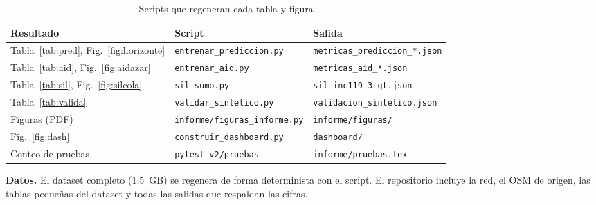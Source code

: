\begin{table}[h]
\centering
\caption{Scripts que regeneran cada tabla y figura}
\label{tab:scripts}
\scriptsize
\setlength{\tabcolsep}{2.5pt}
\begin{tabular}{@{}L{2.35cm}L{2.9cm}L{3.1cm}@{}}
\toprule
Resultado & Script & Salida \\
\midrule
Tabla~\ref{tab:pred}, Fig.~\ref{fig:horizonte} & \texttt{entrenar\_prediccion.py} & \texttt{metricas\_prediccion\_*.json} \\
Tabla~\ref{tab:aid}, Fig.~\ref{fig:aidazar} & \texttt{entrenar\_aid.py} & \texttt{metricas\_aid\_*.json} \\
Tabla~\ref{tab:sil}, Fig.~\ref{fig:silcola} & \texttt{sil\_sumo.py} & \texttt{sil\_inc119\_3\_gt.json} \\
Tabla~\ref{tab:valida} & \texttt{validar\_sintetico.py} & \texttt{validacion\_sintetico.json} \\
Figuras (PDF) & \texttt{informe/figuras\_informe.py} & \texttt{informe/figuras/} \\
Fig.~\ref{fig:dash} & \texttt{construir\_dashboard.py} & \texttt{dashboard/} \\
Conteo de pruebas & \texttt{pytest v2/pruebas} & \texttt{informe/pruebas.tex} \\
\bottomrule
\end{tabular}
\end{table}

\textbf{Datos.} El dataset completo (1,5~GB) se regenera de forma determinista con el script. El repositorio incluye la red, el OSM de origen, las tablas pequeñas del dataset y todas las salidas que respaldan las cifras.
